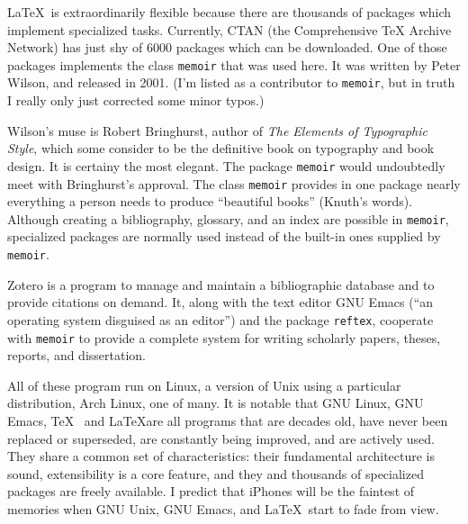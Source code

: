 LaTeX is extraordinarily flexible because there are thousands of packages which implement specialized tasks. Currently, CTAN (the Comprehensive TeX Archive Network) has just shy of 6000 packages which can be downloaded. One of those packages implements the class \texttt{memoir} that was used here. It was written by Peter Wilson, and released in 2001. (I'm listed as a contributor to \texttt{memoir}, but in truth I really only just corrected some minor typos.)
\newpage
\begin{center}
  \textbf{\quad\quad{}\quad\quad{}\quad\quad{}\quad\quad{}}
\end{center}
Wilson's muse is Robert Bringhurst, author of \textit{The Elements of Typographic Style}, which some consider to be the definitive book on typography and book design. It is certainy the most elegant. The package \texttt{memoir} would undoubtedly meet with Bringhurst's approval.  The class \texttt{memoir} provides in one package nearly everything a person needs to produce ``beautiful books'' (Knuth's words). Although creating a bibliography, glossary, and an index are possible in \texttt{memoir}, specialized packages are normally used instead of the built-in ones supplied by \texttt{memoir}.
\begin{center}
  \textbf{\quad\quad{}\quad\quad{}\quad\quad{}\quad\quad{}}
\end{center}
Zotero is a program to manage and maintain a bibliographic database and to provide citations on demand. It, along with the text editor GNU Emacs (``an operating system disguised as an editor'') and the package \texttt{reftex}, cooperate with \texttt{memoir} to provide a complete system for writing scholarly papers, theses, reports, and dissertation.
\begin{center}
  \textbf{\quad\quad{}\quad\quad{}\quad\quad{}\quad\quad{}}
\end{center}
All of these program run on Linux, a version of Unix using a particular distribution, Arch Linux, one of many. It is notable that GNU Linux, GNU Emacs, \TeX  and \LaTeX are all programs that are decades old, have never been replaced or superseded, are constantly being improved, and are actively used. They share a common set of characteristics: their fundamental architecture is sound, extensibility is a core feature, and they and thousands of specialized packages are freely available. I predict that iPhones will be the faintest of memories when GNU Unix, GNU Emacs, and \LaTeX start to fade from view.
